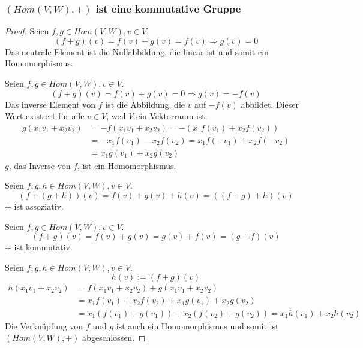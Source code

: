 \documentclass[a4paper,10pt]{article}
\begin{document}
\subsubsection*{$(Hom(V, W), +)$ ist eine kommutative Gruppe}

\begin{proof}
 Seien $f, g \in Hom(V, W), v \in V$.
 \begin{equation}
  (f + g)(v) = f(v) + g(v) = f(v) \Rightarrow g(v) = 0
 \end{equation}
 Das neutrale Element ist die Nullabbildung, die linear ist und somit ein Homomorphismus.

 Seien $f, g \in Hom(V, W), v \in V$.
 \begin{equation}
  (f + g)(v) = f(v) + g(v) = 0 \Rightarrow g(v) = -f(v)
 \end{equation}
 Das inverse Element von $f$ ist die Abbildung, die $v$ auf $-f(v)$ abbildet.
 Dieser Wert existiert für alle $v \in V$, weil $V$ ein Vektorraum ist.
 \begin{align*}
  g(x_1v_1 + x_2v_2) & = -f(x_1v_1 + x_2v_2) = -(x_1f(v_1) + x_2f(v_2))\\
  & = -x_1f(v_1) - x_2f(v_2) = x_1f(-v_1) + x_2f(-v_2)\\
  & = x_1g(v_1) + x_2g(v_2)
 \end{align*}
 $g$, das Inverse von $f$, ist ein Homomorphismus.

 Seien $f, g, h \in Hom(V, W), v \in V$.
 \begin{equation}
  (f + (g + h))(v) = f(v) + g(v) + h(v) = ((f + g) + h)(v)
 \end{equation}
 $+$ ist assoziativ.

 Seien $f, g \in Hom(V, W), v \in V$.
 \begin{equation}
  (f + g)(v) = f(v) + g(v) = g(v) + f(v) = (g + f)(v)
 \end{equation}
 $+$ ist kommutativ.
 
 Seien $f, g, h \in Hom(V, W), v \in V$.
 \begin{equation}
  h(v) := (f + g)(v)
 \end{equation}
 \begin{align*}
  h(x_1v_1 + x_2v_2) & = f(x_1v_1 + x_2v_2) + g(x_1v_1 + x_2v_2)\\
  & = x_1f(v_1) + x_2f(v_2) + x_1g(v_1) + x_2g(v_2)\\
  & = x_1(f(v_1) + g(v_1)) + x_2(f(v_2) + g(v_2)) = x_1h(v_1) + x_2h(v_2)
 \end{align*}
 Die Verknüpfung von $f$ und $g$ ist auch ein Homomorphismus und somit ist $(Hom(V, W), +)$ abgeschlossen.
\end{proof}
\end{document}
